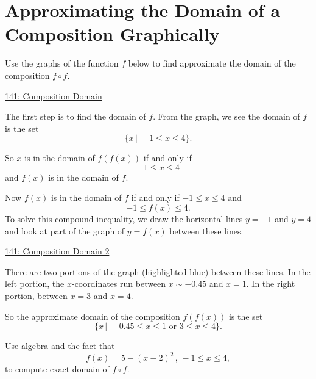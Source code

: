 \documentclass{ximera}
\begin{document}
\section{Approximating the Domain of a Composition Graphically}
\begin{example}  \label{Er4r5d6t364}
Use the graphs of the function $f$ below to find approximate the domain of the composition $f\circ f$.

\begin{onlineOnly}
    \begin{center}
\end{center}
\end{onlineOnly}

\href{https://www.desmos.com/calculator/e1vf1vt06j}{141: Composition Domain}

\begin{explanation}
The first step is to find the domain of $f$. From the graph, we see the domain of $f$ is the set
\[
  \{  x \, | \, -1\leq x \leq 4 \}.
\]

So $x$ is in the domain of $f(f(x))$ if and only if
\[
   - 1\leq x \leq 4
\]
and $f(x)$ is in the domain of $f$. 

Now $f(x)$ is in the domain of $f$ if and only if $-1\leq x\leq 4$ and
\[
         -1 \leq f(x) \leq 4. 
\]
To solve this compound inequality, we draw the horizontal lines $y=-1$ and $y=4$ and look at part of the graph of $y=f(x)$ between these lines.

\begin{onlineOnly}
    \begin{center}
\end{center}
\end{onlineOnly}

\href{https://www.desmos.com/calculator/idj0lpyoya}{141: Composition Domain 2}

There are two portions of the graph (highlighted blue) between these lines. In the left portion, the $x$-coordinates run between $x\sim -0.45$ and $x=1$. In the right portion, between $x=3$ and $x=4$.

So the approximate domain of the composition $f(f(x))$ is the set
\[
   \{ x \, | \, -0.45 \leq x \leq 1 \text{ or } 3\leq x \leq 4 \}.
\]

\end{explanation}
\end{example}

\begin{question} \label{Q33rr3}
Use algebra and the fact that
\[
   f(x) = 5 - (x-2)^2 \, , \, -1\leq x \leq 4,
\]
to compute exact domain of $f\circ f$.
\end{question}
\end{document}
